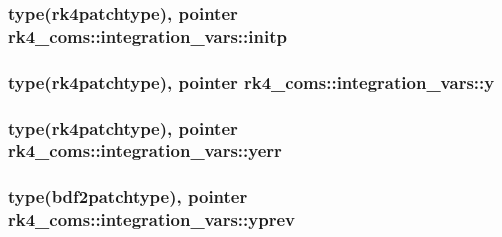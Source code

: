 \subsubsection[{\texorpdfstring{initp}{initp}}]{\setlength{\rightskip}{0pt plus 5cm}type({\bf rk4patchtype}), pointer rk4\+\_\+coms\+::integration\+\_\+vars\+::initp}\hypertarget{structrk4__coms_1_1integration__vars_a75f379d1970d5202750713a4c41f2677}{}\label{structrk4__coms_1_1integration__vars_a75f379d1970d5202750713a4c41f2677}
\subsubsection[{\texorpdfstring{y}{y}}]{\setlength{\rightskip}{0pt plus 5cm}type({\bf rk4patchtype}), pointer rk4\+\_\+coms\+::integration\+\_\+vars\+::y}\hypertarget{structrk4__coms_1_1integration__vars_aa88675d2e80e0fdcbd23a575f937821d}{}\label{structrk4__coms_1_1integration__vars_aa88675d2e80e0fdcbd23a575f937821d}
\subsubsection[{\texorpdfstring{yerr}{yerr}}]{\setlength{\rightskip}{0pt plus 5cm}type({\bf rk4patchtype}), pointer rk4\+\_\+coms\+::integration\+\_\+vars\+::yerr}\hypertarget{structrk4__coms_1_1integration__vars_a7a0f408ecb7a7d0aa7b657134ffbbb2d}{}\label{structrk4__coms_1_1integration__vars_a7a0f408ecb7a7d0aa7b657134ffbbb2d}
\subsubsection[{\texorpdfstring{yprev}{yprev}}]{\setlength{\rightskip}{0pt plus 5cm}type({\bf bdf2patchtype}), pointer rk4\+\_\+coms\+::integration\+\_\+vars\+::yprev}\hypertarget{structrk4__coms_1_1integration__vars_adba39929ddefffa3c1f201bc49647406}{}\label{structrk4__coms_1_1integration__vars_adba39929ddefffa3c1f201bc49647406}
